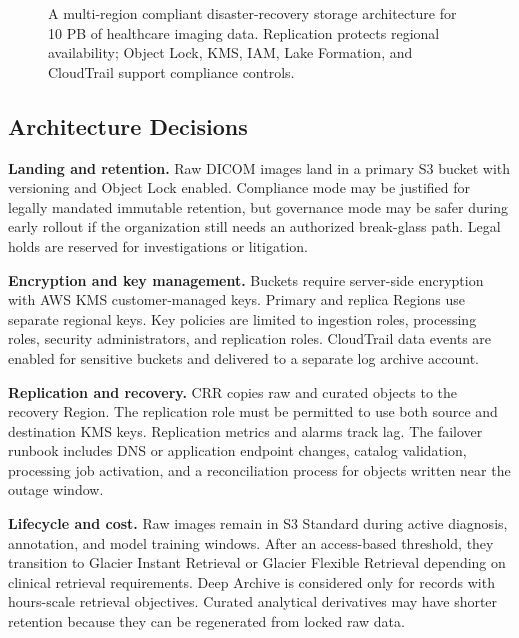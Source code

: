 \begin{figure}[H]
{%
    }
    \caption{A multi-region compliant disaster-recovery storage architecture for 10 PB of healthcare imaging data. Replication protects regional availability; Object Lock, KMS, IAM, Lake Formation, and CloudTrail support compliance controls.}
    \label{fig:healthcare-dr-architecture}
\end{figure}

\subsection{Architecture Decisions}
\textbf{Landing and retention.} Raw DICOM images land in a primary S3 bucket with versioning and Object Lock enabled. Compliance mode may be justified for legally mandated immutable retention, but governance mode may be safer during early rollout if the organization still needs an authorized break-glass path. Legal holds are reserved for investigations or litigation.

\textbf{Encryption and key management.} Buckets require server-side encryption with AWS KMS customer-managed keys. Primary and replica Regions use separate regional keys. Key policies are limited to ingestion roles, processing roles, security administrators, and replication roles. CloudTrail data events are enabled for sensitive buckets and delivered to a separate log archive account.

\textbf{Replication and recovery.} CRR copies raw and curated objects to the recovery Region. The replication role must be permitted to use both source and destination KMS keys. Replication metrics and alarms track lag. The failover runbook includes DNS or application endpoint changes, catalog validation, processing job activation, and a reconciliation process for objects written near the outage window.

\textbf{Lifecycle and cost.} Raw images remain in S3 Standard during active diagnosis, annotation, and model training windows. After an access-based threshold, they transition to Glacier Instant Retrieval or Glacier Flexible Retrieval depending on clinical retrieval requirements. Deep Archive is considered only for records with hours-scale retrieval objectives. Curated analytical derivatives may have shorter retention because they can be regenerated from locked raw data.

